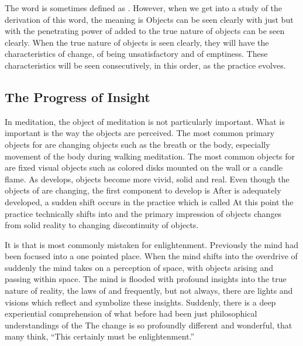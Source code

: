 \documentclass[a5paper,10pt,english]{book}
\begin{document}
\sphinxAtStartPar
The word  is sometimes defined as .
However, when we get into a study of the derivation of this word, the
meaning is  Objects can be seen clearly with just  but
with the penetrating power of  added to  the
true nature of objects can be seen clearly. When the true nature of
objects is seen clearly, they will have the characteristics of change,
of being unsatisfactory and of emptiness. These characteristics will be
seen consecutively, in this order, as the practice evolves.


\subsection{The Progress of Insight}
\label{\detokenize{saints:the-progress-of-insight}}
\sphinxAtStartPar
In  meditation, the object of meditation is not
particularly important. What is important is the way the objects are
perceived. The most common primary objects for  are
changing objects such as the breath or the body, especially movement of
the body during walking meditation. The most common objects for 
are fixed visual objects such as colored disks mounted on the wall or
a candle flame. As  develops, objects become more vivid,
solid and real. Even though the objects of  are changing,
the first component to develop is  After  is
adequately developed, a sudden shift occurs in the practice which is
called  At this point the practice technically shifts
into  and the primary impression of objects changes
from solid reality to changing discontinuity of objects.

\sphinxAtStartPar
It is  that is most commonly mistaken for enlightenment.
Previously the mind had been focused into a one pointed place. When the
mind shifts into the overdrive of  suddenly the mind
takes on a perception of space, with objects arising and passing within
space. The mind is flooded with profound insights into the true nature
of reality, the laws of  and frequently, but not always, there
are lights and visions which reflect and symbolize these insights.
Suddenly, there is a deep experiential comprehension of what before had
been just philosophical understandings of the  The change is
so profoundly different and wonderful, that many think, “This certainly
must be enlightenment.”
\end{document}
